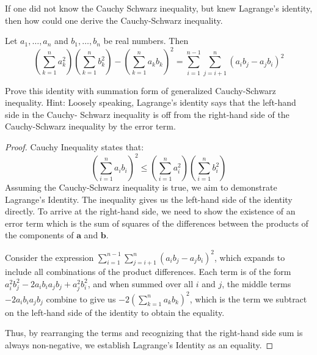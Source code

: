 \documentclass[
	12pt, %
	fleqn, %
	a4paper, %
]{LegrandOrangeBook}
\begin{document}
    \begin{exercise}
        If one did not know the Cauchy Schwarz inequality, but knew Lagrange's identity, then how could one derive the Cauchy-Schwarz inequality.
        \begin{theorem}
            Let \( a_1, \ldots, a_n \) and \( b_1, \ldots, b_n \) be real numbers. Then
            \[
                \left(\sum_{k=1}^{n} a_{k}^{2}\right)\left(\sum_{k=1}^{n} b_{k}^{2}\right)-\left(\sum_{k=1}^{n} a_{k} b_{k}\right)^{2}=\sum_{i=1}^{n-1} \sum_{j=i+1}^{n}\left(a_{i} b_{j}-a_{j} b_{i}\right)^{2}
\]
        \end{theorem}
        Prove this identity with summation form of generalized Cauchy-Schwarz inequality. Hint: Loosely speaking, Lagrange's identity says that the left-hand side in the Cauchy-
        Schwarz inequality is off from the right-hand side of the Cauchy-Schwarz inequality
        by the error term.
    \end{exercise}
    \begin{proof}
    Cauchy Inequality states that: $$\left(\sum_{i=1}^{n} a_{i} b_{i}\right)^{2} \leq\left(\sum_{i=1}^{n} a_{i}^{2}\right)\left(\sum_{i=1}^{n} b_{i}^{2}\right)$$
    Assuming the Cauchy-Schwarz inequality is true, we aim to demonstrate Lagrange's Identity. The inequality gives us the left-hand side of the identity directly. To arrive at the right-hand side, we need to show the existence of an error term which is the sum of squares of the differences between the products of the components of \( \mathbf{a} \) and \( \mathbf{b} \).

Consider the expression \( \sum_{i=1}^{n-1} \sum_{j=i+1}^{n} (a_i b_j - a_j b_i)^2 \), which expands to include all combinations of the product differences. Each term is of the form \( a_i^2 b_j^2 - 2 a_i b_i a_j b_j + a_j^2 b_i^2 \), and when summed over all \( i \) and \( j \), the middle terms \( -2 a_i b_i a_j b_j \) combine to give us \( -2 \left( \sum_{k=1}^{n} a_k b_k \right)^2 \), which is the term we subtract on the left-hand side of the identity to obtain the equality.

Thus, by rearranging the terms and recognizing that the right-hand side sum is always non-negative, we establish Lagrange's Identity as an equality.

    \end{proof}


\chapterspaceabove{6.75cm} 
\chapterspacebelow{7.25cm} 
\end{document}
